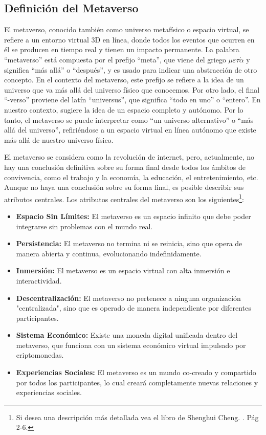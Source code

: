 \documentclass[a4paper,10pt]{article}
\begin{document}
	\subsection{Definición del Metaverso}
	El metaverso, conocido también como universo metafísico o espacio virtual, se refiere a un entorno virtual 3D en línea, donde todos los eventos que ocurren en él se producen en tiempo real y tienen un impacto permanente. La palabra “metaverso” está compuesta por el prefijo “meta”, que viene del griego \( \mu \varepsilon \tau \acute{\alpha} \) y significa “más allá” o “después”, y es usado para indicar una abstracción de otro concepto. En el contexto del metaverso, este prefijo se refiere a la idea de un universo que va más allá del universo físico que conocemos. Por otro lado, el final “-verso” proviene del latín “universus”, que significa “todo en uno” o “entero”. En nuestro contexto, sugiere la idea de un espacio completo y autónomo. Por lo tanto, el metaverso se puede interpretar como “un universo alternativo” o “más allá del universo”, refiriéndose a un espacio virtual en línea autónomo que existe más allá de nuestro universo físico.
	
	El metaverso se considera como la revolución de internet, pero, actualmente, no hay una conclusión definitiva sobre su forma final desde todos los ámbitos de convivencia, como el trabajo y la economía, la educación, el entretenimiento, etc. Aunque no haya una conclusión sobre su forma final, es posible describir sus atributos centrales.
	Los atributos centrales del metaverso son los siguientes\footnote{Si desea una descripción más detallada vea el libro de Shenghui Cheng. \cite{cheng2023metaverse}. Pág 2-6.}:
	\begin{itemize}
		\item \textbf{Espacio Sin Límites:} El metaverso es un espacio infinito que debe poder integrarse sin problemas con el mundo real.
		\item \textbf{Persistencia:} El metaverso no termina ni se reinicia, sino que opera de manera abierta y continua, evolucionando indefinidamente.
		\item \textbf{Inmersión:} El metaverso es un espacio virtual con alta inmersión e interactividad.
		\item \textbf{Descentralización:} El metaverso no pertenece a ninguna organización "centralizada", sino que es operado de manera independiente por diferentes participantes.
		\item \textbf{Sistema Económico:} Existe una moneda digital unificada dentro del metaverso, que funciona con un sistema económico virtual impulsado por criptomonedas.
		\item \textbf{Experiencias Sociales:} El metaverso es un mundo co-creado y compartido por todos los participantes, lo cual creará completamente nuevas relaciones y experiencias sociales.
	\end{itemize}
\end{document}
